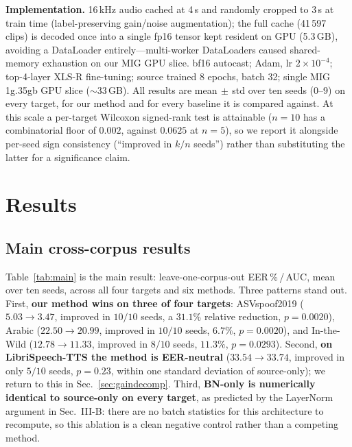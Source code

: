 \documentclass[conference]{IEEEtran}
\begin{document}
\textbf{Implementation.} 16\,kHz audio cached at 4\,s and randomly cropped to
3\,s at train time (label-preserving gain/noise augmentation); the full cache
(41\,597 clips) is decoded once into a single fp16 tensor kept resident on GPU
(5.3\,GB), avoiding a DataLoader entirely---multi-worker DataLoaders caused
shared-memory exhaustion on our MIG GPU slice. bf16 autocast; Adam, lr
$2\times10^{-4}$; top-4-layer XLS-R fine-tuning; source trained 8 epochs, batch
32; single MIG 1g.35gb GPU slice ($\sim$33\,GB). All results are mean$\,\pm\,$std
over ten seeds (0--9) on every target, for our method and for every baseline it
is compared against. At this scale a per-target Wilcoxon signed-rank test is
attainable ($n{=}10$ has a combinatorial floor of $0.002$, against $0.0625$ at
$n{=}5$), so we report it alongside per-seed sign consistency (``improved in
$k/n$ seeds'') rather than substituting the latter for a significance claim.

\section{Results}
\subsection{Main cross-corpus results}
\label{sec:main-results}
Table~\ref{tab:main} is the main result: leave-one-corpus-out EER\,\%\,/\,AUC,
mean over ten seeds, across all four targets and six
methods. Three patterns stand out. First, \textbf{our method wins on three of
four targets}: ASVspoof2019 ($5.03\!\to\!3.47$, improved in $10/10$ seeds, a
$31.1\%$ relative reduction, $p{=}0.0020$), Arabic ($22.50\!\to\!20.99$,
improved in $10/10$ seeds, $6.7\%$, $p{=}0.0020$), and In-the-Wild
($12.78\!\to\!11.33$, improved in $8/10$ seeds, $11.3\%$, $p{=}0.0293$).
Second, \textbf{on LibriSpeech-TTS the method is EER-neutral}
($33.54\!\to\!33.74$, improved in only $5/10$ seeds, $p{=}0.23$, within one
standard deviation of source-only); we return to
this in Sec.~\ref{sec:gaindecomp}. Third, \textbf{BN-only is numerically
identical to source-only on every target}, as predicted by the LayerNorm
argument in Sec.~III-B: there are no batch statistics for this architecture to
recompute, so this ablation is a clean negative control rather than a
competing method.
\end{document}
